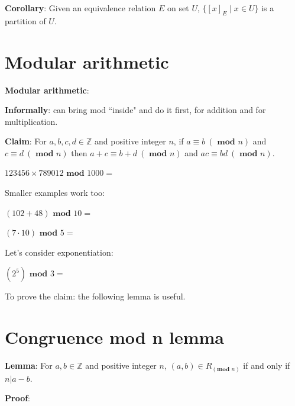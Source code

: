 \documentclass[12pt, oneside]{article}
\begin{document}
\vfill

{\bf Corollary}: Given an equivalence relation $E$ on set $U$,  
$\{ [x]_{E} \mid x \in U  \}$ is a partition of $U$.
\vfill \vfill
\section*{Modular arithmetic}


{\bf Modular arithmetic}: 


{\bf Informally}: can bring mod ``inside" and do it first, for addition and for multiplication.

{\bf Claim}: For $a, b, c, d \in \mathbb{Z}$ 
and positive integer $n$, if $a \equiv b ~(\textbf{ mod } n)$ and $c \equiv d ~(\textbf{ mod } n)$ 
then $a+c \equiv b+d ~(\textbf{ mod } n)$ and $ac \equiv bd ~(\textbf{ mod } n)$.

$123456 \times 789012 \textbf{ mod } 1000 = $

\vfill

Smaller examples work too: 

$(102 + 48) \textbf{ mod } 10 = $ 

$(7 \cdot 10) \textbf{ mod } 5 =$

Let's consider exponentiation: 

$(2^5) \textbf{ mod } 3 = $ 

\vfill

To prove the claim: the following lemma is useful. \vfill
\section*{Congruence mod n lemma}


{\bf Lemma}: For $a, b \in \mathbb{Z}$ 
and positive integer $n$, $(a,b) \in R_{(\textbf{mod } n)}$ if and only if  $n | a-b$.

{\bf Proof}: 

\phantom{Consider arbitrary integers $a,b$ and arbitrary positive integer $n$.}


\end{document}
